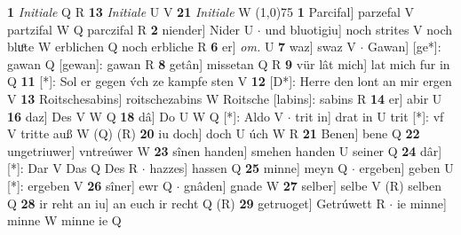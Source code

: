 \documentclass[8pt,a4paper,notitlepage]{article}
\begin{document}
\begin{table}[ht]
\begin{minipage}[t]{0.5\linewidth}
\textbf{1} \textit{Initiale} Q R  \textbf{13} \textit{Initiale} U V  \textbf{21} \textit{Initiale} W  \newline
\line(1,0){75} \newline
\textbf{1} Parcifal] parzefal V partzifal W Q parczifal R \textbf{2} niender] Nider U  $\cdot$ und bluotigiu] noch strites V noch bluͦte W erblichen Q noch erbliche R \textbf{6} er] \textit{om.} U \textbf{7} waz] swaz V  $\cdot$ Gawan] [ge*]: gawan Q [gewan]: gawan R \textbf{8} getân] missetan Q R \textbf{9} vür lât mich] lat mich fur in Q \textbf{11} [*]: Sol er gegen v́ch ze kampfe sten V \textbf{12} [D*]: Herre den lont an mir ergen V \textbf{13} Roitschesabins] roitschezabins W Roitsche [labins]: sabins R \textbf{14} er] abir U \textbf{16} daz] Des V W Q \textbf{18} dâ] Do U W Q [*]: Aldo V  $\cdot$ trit in] drat in U trit [*]: vf V tritte auß W (Q) (R) \textbf{20} iu doch] doch U úch W R \textbf{21} Benen] bene Q \textbf{22} ungetriuwer] vntreúwer W \textbf{23} sînen handen] smehen handen U seiner Q \textbf{24} dâr] [*]: Dar V Das Q Des R  $\cdot$ hazzes] hassen Q \textbf{25} minne] meyn Q  $\cdot$ ergeben] geben U [*]: ergeben V \textbf{26} sîner] ewr Q  $\cdot$ gnâden] gnade W \textbf{27} selber] selbe V (R) selben Q \textbf{28} ir reht an iu] an euch ir recht Q (R) \textbf{29} getruoget] Getrúwett R  $\cdot$ ie minne] minne W minne ie Q \newline
\end{minipage}
\end{table}
\end{document}
